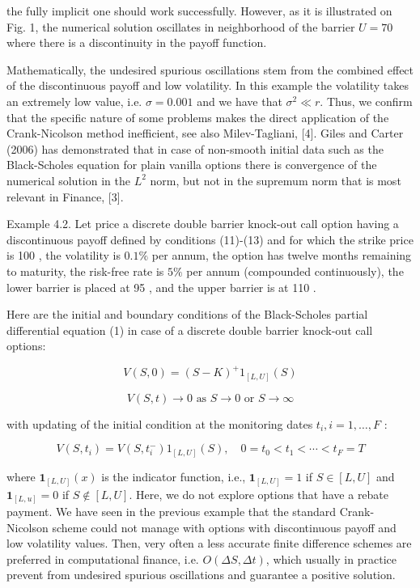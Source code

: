 \documentclass[10pt]{article}
\begin{document}
the fully implicit one should work successfully. However, as it is illustrated on Fig. 1, the numerical solution oscillates in neighborhood of the barrier $U=70$ where there is a discontinuity in the payoff function.

Mathematically, the undesired spurious oscillations stem from the combined effect of the discontinuous payoff and low volatility. In this example the volatility takes an extremely low value, i.e. $\sigma=0.001$ and we have that $\sigma^{2} \ll r$. Thus, we confirm that the specific nature of some problems makes the direct application of the Crank-Nicolson method inefficient, see also Milev-Tagliani, [4]. Giles and Carter (2006) has demonstrated that in case of non-smooth initial data such as the Black-Scholes equation for plain vanilla options there is convergence of the numerical solution in the $L^{2}$ norm, but not in the supremum norm that is most relevant in Finance, [3].

Example 4.2. Let price a discrete double barrier knock-out call option having a discontinuous payoff defined by conditions (11)-(13) and for which the strike price is 100 , the volatility is $0.1 \%$ per annum, the option has twelve months remaining to maturity, the risk-free rate is $5 \%$ per annum (compounded continuously), the lower barrier is placed at 95 , and the upper barrier is at 110 .

Here are the initial and boundary conditions of the Black-Scholes partial differential equation (1) in case of a discrete double barrier knock-out call options:


\begin{equation*}
V(S, 0)=(S-K)^{+} 1_{[L, U]}(S) \tag{11}
\end{equation*}



\begin{equation*}
V(S, t) \rightarrow 0 \text { as } S \rightarrow 0 \text { or } S \rightarrow \infty \tag{12}
\end{equation*}


with updating of the initial condition at the monitoring dates $t_{i}, i=1, \ldots, F$ :


\begin{equation*}
V\left(S, t_{i}\right)=V\left(S, t_{i}^{-}\right) 1_{[L, U]}(S), \quad 0=t_{0}<t_{1}<\cdots<t_{F}=T \tag{13}
\end{equation*}


where $\mathbf{1}_{[L, U]}(x)$ is the indicator function, i.e., $\mathbf{1}_{[L, U]}=1$ if $S \in[L, U]$ and $\mathbf{1}_{[L, u]}=0$ if $S \notin[L, U]$. Here, we do not explore options that have a rebate payment. We have seen in the previous example that the standard Crank-Nicolson scheme could not manage with options with discontinuous payoff and low volatility values. Then, very often a less accurate finite difference schemes are preferred in computational finance, i.e. $O(\Delta S, \Delta t)$, which usually in practice prevent from undesired spurious oscillations and guarantee a positive solution.
\end{document}
